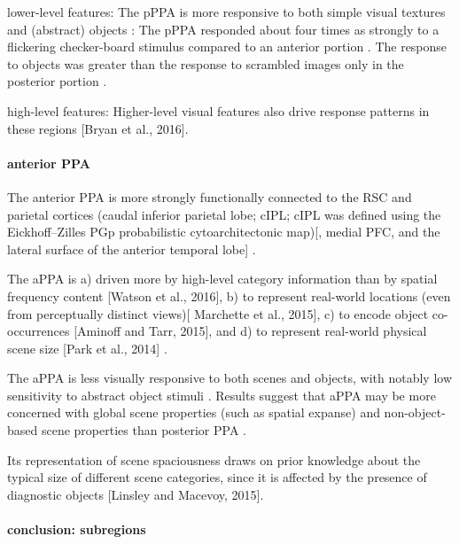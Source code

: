\documentclass[english]{article}
\begin{document}
lower-level features: The pPPA is more responsive to both simple visual textures
and (abstract) objects \citep{arcaro2009retinotopic,
baldassano2013differential}:
%
The pPPA responded about four times as strongly to a flickering checker-board
stimulus compared to an anterior portion \citep{arcaro2009retinotopic}.
%
The response to objects was greater than the response to scrambled images only
in the posterior portion \citep{arcaro2009retinotopic}.

%
high-level features: Higher-level visual features also drive response patterns
in these regions [Bryan et al., 2016].


\paragraph{anterior PPA}

The anterior PPA is more strongly functionally connected to the RSC and parietal
cortices (caudal inferior parietal lobe; cIPL; cIPL was defined using the
Eickhoff–Zilles PGp probabilistic cytoarchitectonic map)[, medial PFC, and the
lateral surface of the anterior temporal lobe]
\citep{baldassano2013differential, baldassano2016two}.

\citep{baldassano2016two} The aPPA is
a) driven more by high-level category information than by spatial frequency
content [Watson et al., 2016],
b) to represent real-world locations (even from perceptually distinct views)[
Marchette et al., 2015],
c) to encode object co-occurrences [Aminoff and Tarr, 2015], and
d) to represent real-world physical scene size [Park et al., 2014]
\citep{baldassano2016two}.

The aPPA is less visually responsive to both scenes and objects, with notably
low sensitivity to abstract object stimuli \citep{baldassano2013differential}.
%
Results suggest that aPPA may be more concerned with global scene properties
(such as spatial expanse) and non-object-based scene properties than posterior
PPA \citep{baldassano2013differential}.

Its representation of scene spaciousness draws on prior knowledge about the
typical size of different scene categories, since it is affected by the presence
of diagnostic objects [Linsley and Macevoy, 2015]\citep{baldassano2016two}.



\paragraph{conclusion: subregions}
\end{document}
